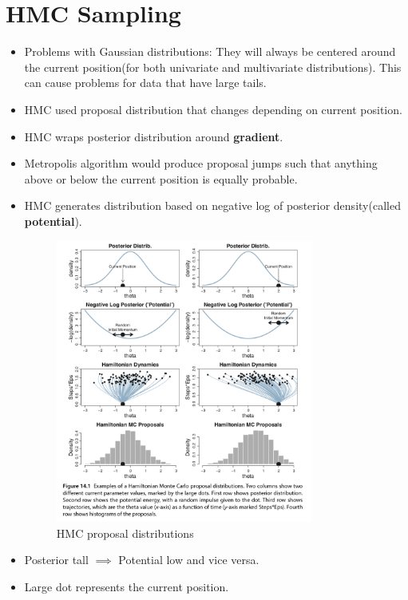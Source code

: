 \documentclass[a4paper]{article}
\begin{document}
\section{HMC Sampling}
\begin{itemize}
    \item Problems with Gaussian distributions: They will always be centered around the current position(for both univariate and multivariate distributions). This can cause problems for data that have large tails.
    \item HMC used proposal distribution that changes depending on current position.
    \item HMC wraps posterior distribution around \textbf{gradient}. 
    \item Metropolis algorithm would produce proposal jumps such that anything above or below the current position is equally probable.
    \item HMC generates distribution based on negative log of posterior density(called \textbf{potential}). 
    \begin{figure}[H]
        \centering
        \includegraphics[width=0.8\textwidth]{potential}
        \caption{HMC proposal distributions}
        \label{fig:potential}
    \end{figure}
    \item Posterior tall $\implies$ Potential low and vice versa.
    \item Large dot represents the current position.

\end{itemize}
\end{document}
